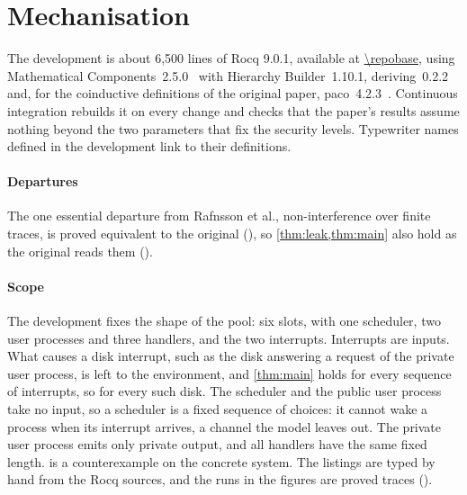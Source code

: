 \section{Mechanisation}\label{sec:mechanisation}

The development is about 6{,}500 lines of Rocq 9.0.1, available at
\url{\repobase}, using Mathematical Components~2.5.0~\cite{mathcomp} with
Hierarchy Builder~1.10.1, deriving~0.2.2 and, for the coinductive definitions of
the original paper, paco~4.2.3~\cite{paco}. Continuous
integration rebuilds it on every change and checks that the paper's results
assume nothing beyond the two parameters that fix the security levels. Typewriter
names defined in the development link to their definitions.

\paragraph{Departures} The one essential departure from Rafnsson et al.,
non-interference over finite traces, is proved equivalent to the original
(), so \cref{thm:leak,thm:main} also hold as the original reads them
(\appx).

\paragraph{Scope} The development fixes the shape of the pool: six slots, with one
scheduler, two user processes and three handlers, and the two interrupts. Interrupts
are inputs. What causes a disk interrupt, such as the disk answering a request of the
private user process, is left to the environment, and \cref{thm:main} holds for every
sequence of interrupts, so for every such disk. The scheduler and the public user
process take no input, so a scheduler is a fixed sequence of choices: it cannot wake a
process when its interrupt arrives, a channel the model leaves out. The private user
process emits only private output, and all handlers have the same fixed length.
 is a counterexample on the concrete system. The listings are typed by hand
from the Rocq sources, and the runs in the figures are proved traces (\appx).

